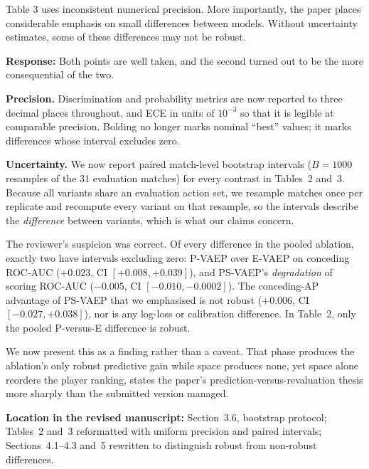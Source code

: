 \documentclass[11pt,a4paper]{article}
\newcommand{\response}[2]{%
  \begin{responsebox}
  \textbf{Response:}
  #1
  \end{responsebox}
  \begin{locationbox}
  \textbf{Location in the revised manuscript:}
  #2
  \end{locationbox}
}
\begin{document}
\begin{reviewbox}
Table 3 uses inconsistent numerical precision. More importantly, the paper places considerable emphasis on small differences between models. Without uncertainty estimates, some of these differences may not be robust.
\end{reviewbox}
\response{Both points are well taken, and the second turned out to be the more consequential of the two.

\textbf{Precision.} Discrimination and probability metrics are now reported to three decimal places throughout, and ECE in units of $10^{-3}$ so that it is legible at comparable precision. Bolding no longer marks nominal ``best'' values; it marks differences whose interval excludes zero.

\textbf{Uncertainty.} We now report paired match-level bootstrap intervals ($B = 1000$ resamples of the 31 evaluation matches) for every contrast in Tables~2 and~3. Because all variants share an evaluation action set, we resample matches once per replicate and recompute every variant on that resample, so the intervals describe the \emph{difference} between variants, which is what our claims concern.

The reviewer's suspicion was correct. Of every difference in the pooled ablation, exactly two have intervals excluding zero: P-VAEP over E-VAEP on conceding ROC-AUC ($+0.023$, CI $[+0.008, +0.039]$), and PS-VAEP's \emph{degradation} of scoring ROC-AUC ($-0.005$, CI $[-0.010, -0.0002]$). The conceding-AP advantage of PS-VAEP that we emphasised is not robust ($+0.006$, CI $[-0.027, +0.038]$), nor is any log-loss or calibration difference. In Table~2, only the pooled P-versus-E difference is robust.

We now present this as a finding rather than a caveat. That phase produces the ablation's only robust predictive gain while space produces none, yet space alone reorders the player ranking, states the paper's prediction-versus-revaluation thesis more sharply than the submitted version managed.}{Section~3.6, bootstrap protocol; Tables~2 and~3 reformatted with uniform precision and paired intervals; Sections~4.1--4.3 and~5 rewritten to distinguish robust from non-robust differences.}
\end{document}
